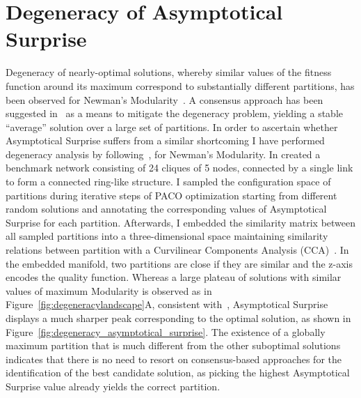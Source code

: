 \section{Degeneracy of Asymptotical Surprise}\label{sec:degeneracy_asymptotical_surprise}
Degeneracy of nearly-optimal solutions, whereby similar values of the fitness function around its maximum correspond to substantially different partitions, has been observed for Newman's Modularity~\cite{good2009}.
A consensus approach has been suggested in~\cite{lancichinetti2012} as a means to mitigate the degeneracy problem, yielding a stable ``average'' solution over a large set of partitions.
In order to ascertain whether Asymptotical Surprise suffers from a similar shortcoming I have performed degeneracy analysis by following~\cite{good2009}, for Newman's Modularity.
In created a benchmark network consisting of 24 cliques of 5 nodes, connected by a single link to form a connected ring-like structure.
I sampled the configuration space of partitions during iterative steps of PACO optimization starting from different random solutions and annotating the corresponding values of Asymptotical Surprise for each partition.
Afterwards, I embedded the similarity matrix between all sampled partitions into a three-dimensional space maintaining similarity relations between partition with a Curvilinear Components Analysis (CCA)~\cite{good2009}.
In the embedded manifold, two partitions are close if they are similar and the z-axis encodes the quality function.
Whereas a large plateau of solutions with similar values of maximum Modularity is observed as in Figure~\ref{fig:degeneracylandscape}A, consistent with~\cite{good2009}, Asymptotical Surprise displays a much sharper peak corresponding to the optimal solution, as shown in Figure~\ref{fig:degeneracy_asymptotical_surprise}.
The existence of a globally maximum partition that is much different from the other suboptimal solutions indicates that there is no need to resort on consensus-based approaches for the identification of the best candidate solution, as picking the highest Asymptotical Surprise value already yields the correct partition.

